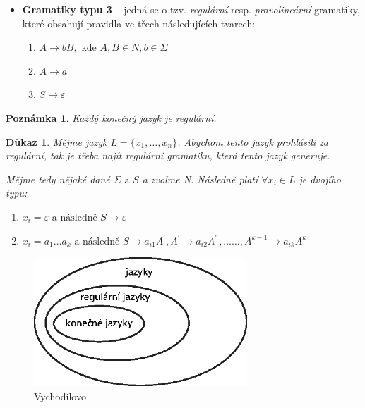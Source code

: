 \documentclass[10pt, a4paper, titlepage]{article}
\theoremstyle{note}
\newtheorem{dukaz}{Důkaz}
\newtheorem{poznamka}{Poznámka}
\begin{document}
\begin{itemize}
\item
\textbf{Gramatiky typu 3\label{gram-3}} -- jedná se o tzv. \emph{regulární} resp. \emph{pravolineární} gramatiky, které obsahují pravidla ve třech následujících tvarech:

\begin{enumerate}
\item
$A \rightarrow bB, \text{ kde } A,B \in N, b \in \Sigma$

\item
$A \rightarrow a$

\item
$S \rightarrow \varepsilon$
\end{enumerate}

\end{itemize}

\begin{poznamka}
Každý konečný jazyk je regulární.
\end{poznamka}

\begin{dukaz}
Mějme jazyk $L = \lbrace x_{1},\ldots, x_{n} \rbrace$. Abychom tento jazyk prohlásili za regulární, tak je třeba najít regulární gramatiku,
která tento jazyk generuje.

Mějme tedy nějaké dané $\Sigma \text{ a } S$ a zvolme \emph{N}. Následně platí $\forall x_{i} \in L$ je dvojího typu:

\begin{enumerate}
\item
$x_{i} = \varepsilon \text{ a následně } S \rightarrow \varepsilon$

\item
$x_{i} = a_{1}\ldots a_{k} \text{ a následně } S \rightarrow a_{i1}A^{'}, A^{'} \rightarrow a_{i2}A^{''},\ldots\ldots, A^{k-1} \rightarrow a_{ik}A^{k}$
\end{enumerate}
\end{dukaz}

\begin{figure}[ht]
\centering\includegraphics[width=8cm]{vajicko-1.eps}
\caption{Vychodilovo }\label{obr-2}
\end{figure}
\end{document}
